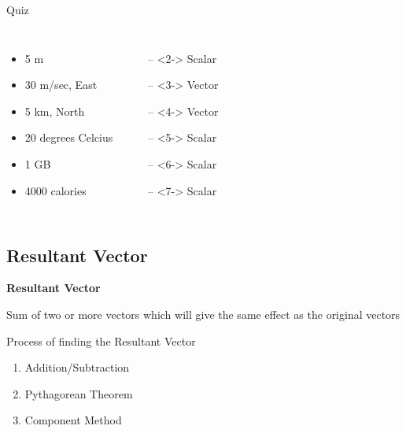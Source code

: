 \documentclass[aspectratio=43]{beamer}
\begin{document}
\begin{frame}{Quiz}
		
		\begin{columns}
			\begin{itemize}
				\item 5 m 
				\item 30 m/sec, East
				\item 5 km, North
				\item 20 degrees Celcius
				\item 1 GB
				\item 4000 calories
			\end{itemize}
			\begin{itemize}
				\item[--]<2-> Scalar
				\item[--]<3-> Vector
				\item[--]<4-> Vector
				\item[--]<5-> Scalar
				\item[--]<6-> Scalar
				\item[--]<7-> Scalar
			\end{itemize}
		\end{columns}
\end{frame}

\subsection{Resultant Vector}

\begin{frame}
	\textbf{Resultant Vector}
	\begin{definition}
		Sum of two or more vectors which will give the same effect as the original vectors
	\end{definition}
\end{frame}


\begin{frame}{Process of finding the Resultant Vector}
	
	\begin{enumerate}
		\item Addition/Subtraction
		\item Pythagorean Theorem
		\item Component Method
	\end{enumerate}
	
\end{frame}
\end{document}
